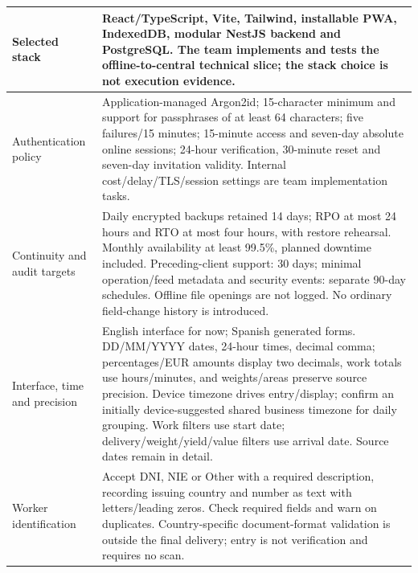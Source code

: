{\begin{longtable}{L{0.24}L{0.76}}
\midrule
{}\label{decision:Q-ARCH-01}Selected stack & React/TypeScript, Vite, Tailwind, installable PWA, IndexedDB, modular NestJS backend and PostgreSQL. The team implements and tests the offline-to-central technical slice; the stack choice is not execution evidence. \\
\midrule
{}\label{decision:Q-NFR-01}Authentication policy & Application-managed Argon2id; 15-character minimum and support for passphrases of at least 64 characters; five failures/15 minutes; 15-minute access and seven-day absolute online sessions; 24-hour verification, 30-minute reset and seven-day invitation validity. Internal cost/delay/TLS/session settings are team implementation tasks. \\
\midrule
{}\label{decision:Q-NFR-02}\label{decision:Q-NFR-04}Continuity and audit targets & Daily encrypted backups retained 14 days; RPO at most 24 hours and RTO at most four hours, with restore rehearsal. Monthly availability at least 99.5\%, planned downtime included. Preceding-client support: 30 days; minimal operation/feed metadata and security events: separate 90-day schedules. Offline file openings are not logged. No ordinary field-change history is introduced. \\
\midrule
{}\label{decision:Q-NFR-08}\label{decision:Q-IND-01}\label{decision:D-35}Interface, time and precision & English interface for now; Spanish generated forms. DD/MM/YYYY dates, 24-hour times, decimal comma; percentages/EUR amounts display two decimals, work totals use hours/minutes, and weights/areas preserve source precision. Device timezone drives entry/display; confirm an initially device-suggested shared business timezone for daily grouping. Work filters use start date; delivery/weight/yield/value filters use arrival date. Source dates remain in detail. \\
\midrule
{}\label{decision:Q-ID-01}Worker identification & Accept DNI, NIE or Other with a required description, recording issuing country and number as text with letters/leading zeros. Check required fields and warn on duplicates. Country-specific document-format validation is outside the final delivery; entry is not verification and requires no scan. \\

\end{longtable}}
